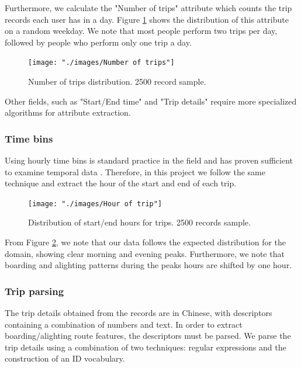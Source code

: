 \documentclass{article}
\begin{document}
Furthermore, we calculate the "Number of trips" attribute which counts the trip records each user has in a day. Figure \ref{fig:preprocessing/num_trips} shows the distribution of this attribute on a random weekday. We note that most people perform two trips per day, followed by people who perform only one trip a day. %


\begin{figure}[H]
  \centering
  \texttt{[image: "./images/Number of trips"]}
  \caption{Number of trips distribution. 2500 record sample.}
  \label{fig:preprocessing/num_trips}
\end{figure}

Other fields, such as "Start/End time" and "Trip details" require more specialized algorithms for attribute extraction.

\subsubsection{Time bins}
Using hourly time bins is standard practice in the field and has proven sufficient to examine temporal data \cite{langlois2016inferring} \cite{ma2017understanding} \cite{morency2007measuring}. Therefore, in this project we follow the same technique and extract the hour of the start and end of each trip.

\begin{figure}[H]
  \centering
  \texttt{[image: "./images/Hour of trip"]}
  \caption{Distribution of start/end hours for trips. 2500 records sample.}
  \label{fig:preprocessing/start_end_hour}
\end{figure}

From Figure \ref{fig:preprocessing/start_end_hour}, we note that our data follows the expected distribution for the domain, showing clear morning and evening peaks. Furthermore, we note that boarding and alighting patterns during the peaks hours are shifted by one hour. %

\subsubsection{Trip parsing} 
\label{sec:tripParsing}
The trip details obtained from the records are in Chinese, with descriptors containing a combination of numbers and text. In order to extract boarding/alighting route features, the descriptors must be parsed. We parse the trip details using a combination of two techniques: regular expressions and the construction of an ID vocabulary. 
\end{document}

